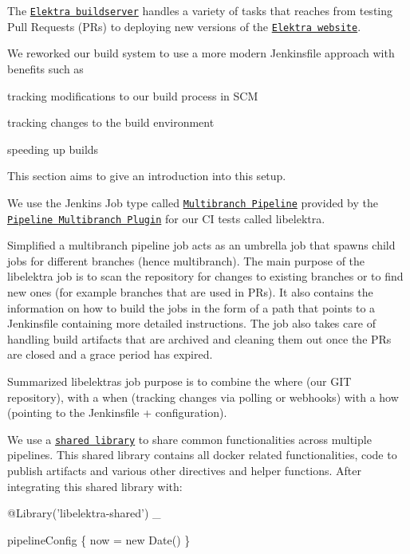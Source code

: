 The \href{https://build.libelektra.org/}{\tt Elektra buildserver} handles a variety of tasks that reaches from testing Pull Requests (P\+Rs) to deploying new versions of the \href{https://www.libelektra.org}{\tt Elektra website}.

We reworked our build system to use a more modern Jenkinsfile approach with benefits such as


\begin{DoxyItemize}
\item tracking modifications to our build process in S\+CM
\item tracking changes to the build environment
\item speeding up builds
\end{DoxyItemize}

This section aims to give an introduction into this setup.

We use the Jenkins Job type called \href{https://jenkins.io/doc/book/pipeline/multibranch/#creating-a-multibranch-pipeline}{\tt Multibranch Pipeline} provided by the \href{https://wiki.jenkins.io/display/JENKINS/Pipeline+Multibranch+Plugin}{\tt Pipeline Multibranch Plugin} for our CI tests called {\ttfamily libelektra}.

Simplified a multibranch pipeline job acts as an umbrella job that spawns child jobs for different branches (hence multibranch). The main purpose of the libelektra job is to scan the repository for changes to existing branches or to find new ones (for example branches that are used in PR\textquotesingle{}s). It also contains the information on how to build the jobs in the form of a path that points to a Jenkinsfile containing more detailed instructions. The job also takes care of handling build artifacts that are archived and cleaning them out once the PR\textquotesingle{}s are closed and a grace period has expired.

Summarized libelektra\textquotesingle{}s job purpose is to combine the where (our G\+IT repository), with a when (tracking changes via polling or webhooks) with a how (pointing to the Jenkinsfile + configuration).

We use a \href{https://www.jenkins.io/doc/book/pipeline/shared-libraries/}{\tt shared library} to share common functionalities across multiple pipelines. This shared library contains all docker related functionalities, code to publish artifacts and various other directives and helper functions. After integrating this shared library with\+:


\begin{DoxyCode}
@Library('libelektra-shared') \_

pipelineConfig \{
  now = new Date()
\}
\end{DoxyCode}


